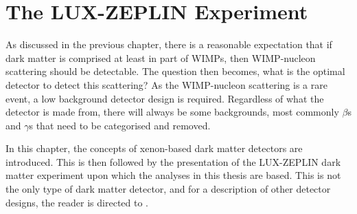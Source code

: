 \chapter{The LUX-ZEPLIN Experiment}
\label{sec:lz_detector_chapter}
\par
As discussed in the previous chapter, there is a reasonable expectation that if dark matter is comprised at least in part of WIMPs, then WIMP-nucleon scattering should be detectable.
The question then becomes, what is the optimal detector to detect this scattering?
As the WIMP-nucleon scattering is a rare event, a low background detector design is required.
Regardless of what the detector is made from, there will always be some backgrounds, most commonly $\beta$s and $\gamma$s that need to be categorised and removed.
\par
In this chapter, the concepts of xenon-based dark matter detectors are introduced.
This is then followed by the presentation of the LUX-ZEPLIN dark matter experiment upon which the analyses in this thesis are based.
This is not the only type of dark matter detector, and for a description of other detector designs, the reader is directed to \cite{direct_detector_designs_ref}.



\clearpage


%